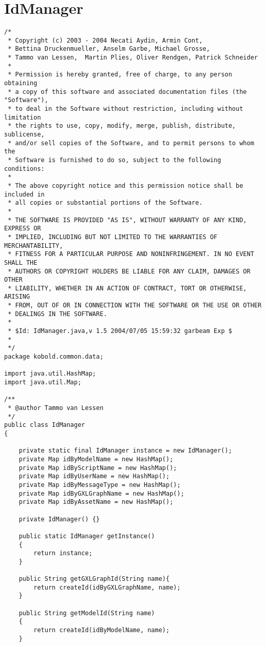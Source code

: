 \section{IdManager}
\small \begin{verbatim}
/*
 * Copyright (c) 2003 - 2004 Necati Aydin, Armin Cont, 
 * Bettina Druckenmueller, Anselm Garbe, Michael Grosse, 
 * Tammo van Lessen,  Martin Plies, Oliver Rendgen, Patrick Schneider
 * 
 * Permission is hereby granted, free of charge, to any person obtaining
 * a copy of this software and associated documentation files (the "Software"),
 * to deal in the Software without restriction, including without limitation
 * the rights to use, copy, modify, merge, publish, distribute, sublicense, 
 * and/or sell copies of the Software, and to permit persons to whom the 
 * Software is furnished to do so, subject to the following conditions:
 *
 * The above copyright notice and this permission notice shall be included in 
 * all copies or substantial portions of the Software.
 *
 * THE SOFTWARE IS PROVIDED "AS IS", WITHOUT WARRANTY OF ANY KIND, EXPRESS OR 
 * IMPLIED, INCLUDING BUT NOT LIMITED TO THE WARRANTIES OF MERCHANTABILITY, 
 * FITNESS FOR A PARTICULAR PURPOSE AND NONINFRINGEMENT. IN NO EVENT SHALL THE 
 * AUTHORS OR COPYRIGHT HOLDERS BE LIABLE FOR ANY CLAIM, DAMAGES OR OTHER 
 * LIABILITY, WHETHER IN AN ACTION OF CONTRACT, TORT OR OTHERWISE, ARISING 
 * FROM, OUT OF OR IN CONNECTION WITH THE SOFTWARE OR THE USE OR OTHER 
 * DEALINGS IN THE SOFTWARE.
 *
 * $Id: IdManager.java,v 1.5 2004/07/05 15:59:32 garbeam Exp $
 *
 */
package kobold.common.data;

import java.util.HashMap;
import java.util.Map;

/**
 * @author Tammo van Lessen
 */
public class IdManager 
{

	private static final IdManager instance = new IdManager();
	private Map idByModelName = new HashMap();
	private Map idByScriptName = new HashMap();
	private Map idByUserName = new HashMap();
	private Map idByMessageType = new HashMap();
	private Map idByGXLGraphName = new HashMap();
	private Map idByAssetName = new HashMap();
	
	private IdManager() {}
	
	public static IdManager getInstance() 
	{
		return instance;
	}
	
	public String getGXLGraphId(String name){
		return createId(idByGXLGraphName, name);
	}

	public String getModelId(String name) 
	{
		return createId(idByModelName, name);
	}


\end{verbatim}
